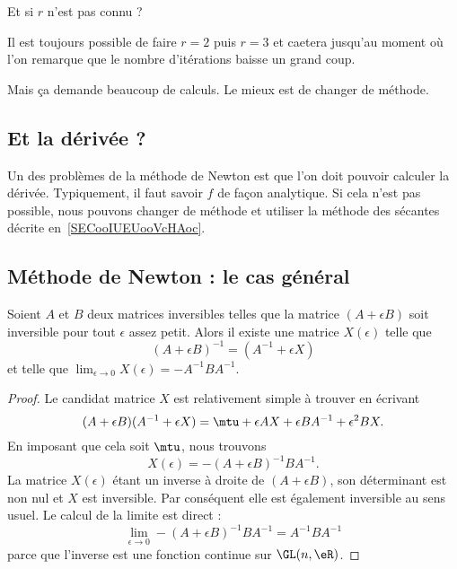 Et si \( r\) n'est pas connu ?

Il est toujours possible de faire \( r=2\) puis \( r=3\) et caetera jusqu'au moment où l'on remarque que le nombre d'itérations baisse un grand coup.

Mais ça demande beaucoup de calculs.  Le mieux est de changer de méthode.

\subsection{Et la dérivée ?}

Un des problèmes de la méthode de Newton est que l'on doit pouvoir calculer la dérivée. Typiquement, il faut savoir \( f\) de façon analytique. Si cela n'est pas possible, nous pouvons changer de méthode et utiliser la méthode des sécantes décrite en~\ref{SECooIUEUooVcHAoc}.


\subsection{Méthode de Newton : le cas général}

\begin{lemma}       \label{LemXdObnV}
	Soient \( A\) et \( B\) deux matrices inversibles telles que la matrice \( (A+\epsilon B)\) soit inversible pour tout \( \epsilon\) assez petit. Alors il existe une matrice \( X(\epsilon)\) telle que
	\begin{equation}
		(A+\epsilon B)^{-1}=(A^{-1}+\epsilon X)
	\end{equation}
	et telle que \( \lim_{\epsilon\to 0}X(\epsilon)=-A^{-1} BA^{-1}\).
\end{lemma}

\begin{proof}
	Le candidat matrice \( X\) est relativement simple à trouver en écrivant
	\begin{equation}
		(A+\epsilon B)(A^{-1}+\epsilon X)=\mtu+\epsilon AX+\epsilon BA^{-1}+\epsilon^2BX.
	\end{equation}
	En imposant que cela soit \( \mtu\), nous trouvons
	\begin{equation}
		X(\epsilon)=-(A+\epsilon B)^{-1} BA^{-1}.
	\end{equation}
	La matrice \( X(\epsilon)\) étant un inverse à droite de \( (A+\epsilon B)\), son déterminant est non nul et \( X\) est inversible. Par conséquent elle est également inversible au sens usuel. Le calcul de la limite est direct :
	\begin{equation}
		\lim_{\epsilon\to 0}-(A+\epsilon B)^{-1} BA^{-1}=A^{-1} BA^{-1}
	\end{equation}
	parce que l'inverse est une fonction continue sur \( \GL(n,\eR)\).
\end{proof}

